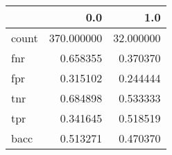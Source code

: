 \begin{tabular}{lrr}
\toprule
{} &         0.0 &        1.0 \\
\midrule
count &  370.000000 &  32.000000 \\
fnr   &    0.658355 &   0.370370 \\
fpr   &    0.315102 &   0.244444 \\
tnr   &    0.684898 &   0.533333 \\
tpr   &    0.341645 &   0.518519 \\
bacc  &    0.513271 &   0.470370 \\
\bottomrule
\end{tabular}
